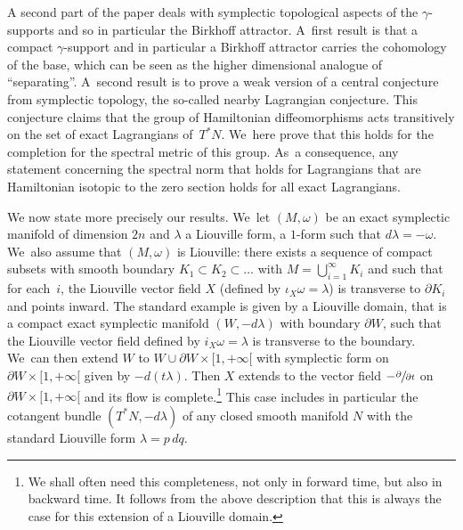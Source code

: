 \documentclass[JEP,XML,SOM,Unicode,NoFloatCountersInSection,published]{cedram}
\theoremstyle{definition}
\begin{document}
A second part of the paper deals with symplectic topological aspects of the $\gamma$\nobreakdash-supports and so in particular the Birkhoff attractor. A~first result is that a compact $\gamma$\nobreakdash-support and in particular a Birkhoff attractor carries the cohomology of the base, which can be seen as the higher dimensional analogue of ``separating''. A~second result is to prove a weak version of a central conjecture from symplectic topology, the so-called nearby Lagrangian conjecture. This conjecture claims that the group of Hamiltonian diffeomorphisms acts transitively on the set of exact Lagrangians of~$T^*N$. We~here prove that this holds for the completion for the spectral metric of this group. As~a consequence, any statement concerning the spectral norm that holds for Lagrangians that are Hamiltonian isotopic to the zero section holds for all exact Lagrangians.

We now state more precisely our results. We~let $(M,\omega)$ be an exact symplectic manifold of dimension $2n$ and $\lambda$ a Liouville form, \ie a $1$-form such that $d\lambda=-\omega$. We~also assume that $(M,\omega)$ is Liouville:
there exists a sequence of compact subsets with smooth boundary $K_1\subset K_2\subset \dots $ with $M=\bigcup_{i=1}^\infty K_i$ and such that for each~$i$, the Liouville vector field $X$ (defined by $\iota_X\omega=\lambda$) is transverse to $\partial K_i$ and points inward.
The standard example is given by a Liouville domain, that is
a compact exact symplectic manifold $(W, -d\lambda)$ with boundary $\partial W$, such that the Liouville vector field defined by $i_X\omega=\lambda$ is transverse to the boundary. We~can then extend $W$ to $W\cup \partial W\times [1,+\infty[$ with symplectic form on $\partial W\times [1,+\infty[$ given by
$-d(t\lambda)$. Then $X$ extends to the vector field $- \sfrac{\partial}{\partial t}$ on $\partial W\times [1,+\infty[$ and its flow is complete.\footnote{We shall often need this completeness, not only in forward time, but also in backward time. It follows from the above description that this is always the case for this extension of a Liouville domain.} This case includes in particular the cotangent bundle $(T^*N, -d\lambda)$ of any closed smooth manifold $N$ with the standard Liouville form $\lambda=p\,dq$.
\end{document}

